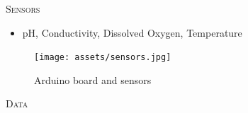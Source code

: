 \documentclass[final,t]{beamer}
\begin{document}
\begin{frame}{}
\begin{columns}
\begin{column}{.5\linewidth}
                \begin{block}{\textsc{Sensors}}
                    \vspace*{6mm}
                    \begin{itemize}
                        \item pH, Conductivity, Dissolved Oxygen, Temperature
                    \end{itemize}
                    \begin{figure}
                        \centering
                        \texttt{[image: assets/sensors.jpg]}
                        \caption{Arduino board and sensors}
                    \end{figure}
                \end{block}

                \begin{block}{\textsc{Data}}
                    \vspace*{6mm}
                \end{block}
            \end{column}


        \end{columns}
    \end{frame}
\end{document}
